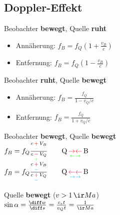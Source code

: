 \documentclass[german]{latex4ei/latex4ei_sheet}
\begin{document}
\begin{sectionbox}
\subsection{Doppler-Effekt}
\begin{cookbox}{}
	\item Beobachter \textbf{bewegt}, Quelle \textbf{ruht}\\ 
		\begin{itemize}[label=$\rightarrow$]
		\item Annäherung: $f_B=f_Q(1+\frac{v_B}{c})$\\
		\item Entfernung: $f_B=f_Q(1-\frac{v_B}{c})$\\
		\end{itemize}
	\item Beobachter \textbf{ruht}, Quelle \textbf{bewegt}\\ 
		\begin{itemize}[label=$\rightarrow$]
			\item Annäherung: $f_B=\frac{f_Q}{1-v_Q/c}$\\
			\item Entfernung: $f_B=\frac{f_Q}{1+v_Q/c}$\\
		\end{itemize}
	\item Beobachter \textbf{bewegt}, Quelle \textbf{bewegt}\\ 
			$f_B = f_Q \frac{c \, \underset{\textcolor{green}{-}}{\textcolor{red}{+}} \, V_B}{c \, \underset{\textcolor{green}{+}}{\textcolor{red}{-}} \, V_Q} \qquad \text{Q} \, \underset{\textcolor{green}{\leftarrow} \textcolor{green}{\rightarrow}}{\textcolor{red}{\rightarrow} \textcolor{red}{\leftarrow}} \, \text{B}$\\
			$f_B = f_Q \frac{c \, \underset{\textcolor{cyan}{-}}{\textcolor{purple}{+}} \, V_B}{c \, \underset{\textcolor{cyan}{-}}{\textcolor{purple}{+}} \, V_Q} \qquad \text{Q} \, \underset{\textcolor{cyan}{\rightarrow} \textcolor{cyan}{\rightarrow}}{\textcolor{purple}{\leftarrow} \textcolor{purple}{\leftarrow}} \, \text{B}$\\
	\item Quelle \textbf{bewegt} ($v>1 \, \ir Ma$)\\
		$\sin \alpha=\frac{\diff w}{\diff s}=\frac{c_s t}{v_Qt}=\frac{1}{\ir Ma}$
\end{cookbox}
\end{sectionbox}
\end{document}

